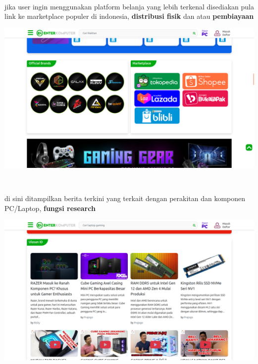 \documentclass{article}
\begin{document}
\\
\begin{minipage}{0.30\textwidth}
    jika user ingin menggunakan platform belanja yang lebih
     terkenal disediakan pula link ke marketplace populer di indonesia, \textbf{distribusi fisik} dan atau \textbf{pembiayaan}
\end{minipage}
\hspace*{0.04\textwidth}
\begin{minipage}{0.65\textwidth}
    \includegraphics[width=\textwidth]{file-29.png}
\end{minipage}
\\
\begin{minipage}{0.30\textwidth}
    di sini ditampilkan berita terkini yang terkait dengan perakitan 
    dan komponen PC/Laptop, \textbf{fungsi research}
\end{minipage}
\hspace*{0.04\textwidth}
\begin{minipage}{0.65\textwidth}
    \includegraphics[width=\textwidth]{file-24.png}
\end{minipage}
\\
\end{document}
